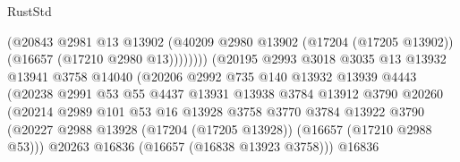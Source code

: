 \begin{lexlean}{RustStd}
\begin{coremodule}
                                        (@20843
                                          @2981
                                          @13
                                          @13902
                                          (@40209
                                            @2980
                                            @13902
                                            (@17204 (@17205 @13902))
                                            (@16657 (@17210 @2980 @13))))))))
                                (@20195
                                  @2993
                                  @3018
                                  @3035
                                  @13
                                  @13932
                                  @13941
                                  @3758
                                  @14040
                                  (@20206
                                    @2992
                                    @735
                                    @140
                                    @13932
                                    @13939
                                    @4443
                                    (@20238
                                      @2991
                                      @53
                                      @55
                                      @4437
                                      @13931
                                      @13938
                                      @3784
                                      @13912
                                      @3790
                                      @20260
                                      (@20214
                                        @2989
                                        @101
                                        @53
                                        @16
                                        @13928
                                        @3758
                                        @3770
                                        @3784
                                        @13922
                                        @3790
                                        (@20227
                                          @2988
                                          @13928
                                          (@17204 (@17205 @13928))
                                          (@16657 (@17210 @2988 @53)))
                                        @20263
                                        @16836
                                        (@16657 (@16838 @13923 @3758)))
                                      @16836

\end{coremodule}
\end{lexlean}
